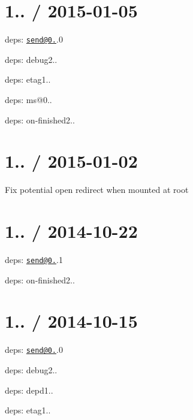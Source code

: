 \section*{1.. / 2015-\/01-\/05 }


\begin{DoxyItemize}
\item deps\+: \href{mailto:send@0.11}{\tt send@0.}.0
\begin{DoxyItemize}
\item deps\+: debug2..
\item deps\+: etag1..
\item deps\+: ms@0..
\item deps\+: on-\/finished2..
\end{DoxyItemize}
\end{DoxyItemize}

\section*{1.. / 2015-\/01-\/02 }


\begin{DoxyItemize}
\item Fix potential open redirect when mounted at root
\end{DoxyItemize}

\section*{1.. / 2014-\/10-\/22 }


\begin{DoxyItemize}
\item deps\+: \href{mailto:send@0.10}{\tt send@0.}.1
\begin{DoxyItemize}
\item deps\+: on-\/finished2..
\end{DoxyItemize}
\end{DoxyItemize}

\section*{1.. / 2014-\/10-\/15 }


\begin{DoxyItemize}
\item deps\+: \href{mailto:send@0.10}{\tt send@0.}.0
\begin{DoxyItemize}
\item deps\+: debug2..
\item deps\+: depd1..
\item deps\+: etag1..
\end{DoxyItemize}
\end{DoxyItemize}

